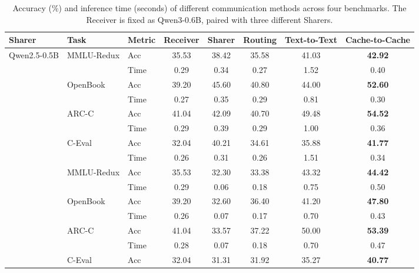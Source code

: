 \begin{table}[t]
\centering
\caption{Accuracy (\%) and inference time (seconds) of different communication methods across four benchmarks. The Receiver is fixed as Qwen3-0.6B, paired with three different Sharers.}
\label{tab:llm_comm}
\footnotesize
\setlength\tabcolsep{4pt}
\begin{tabular}{lll|ccccc}
\toprule
\textbf{Sharer} & \textbf{Task} & \textbf{Metric} & \textbf{Receiver} & \textbf{Sharer} & \textbf{Routing} & \textbf{Text-to-Text} & \textbf{Cache-to-Cache} \\
\midrule
\multirow{9}{*}{Qwen2.5-0.5B} 
 & \multirow{2}{*}{MMLU-Redux}     & Acc  & 35.53 & 38.42 & 35.58 & 41.03 & \textbf{42.92} \\
 &                           & Time & 0.29  & 0.34  & 0.27 & 1.52  & 0.40  \\
\cmidrule(lr){2-8}
 & \multirow{2}{*}{OpenBook} & Acc  & 39.20 & 45.60 & 40.80 & 44.00 & \textbf{52.60} \\
 &                           & Time & 0.27  & 0.35  & 0.29 & 0.81  & 0.30  \\
\cmidrule(lr){2-8}
 & \multirow{2}{*}{ARC-C}    & Acc  & 41.04 & 42.09 & 40.70 & 49.48 & \textbf{54.52} \\
 &                           & Time & 0.29  & 0.39  & 0.29 & 1.00  & 0.36  \\
\cmidrule(lr){2-8}
 & \multirow{2}{*}{C-Eval}   & Acc  & 32.04 & 40.21 & 34.61 & 35.88 & \textbf{41.77} \\
 &                           & Time & 0.26  & 0.31  & 0.26 & 1.51  & 0.34  \\
\midrule
\multirow{9}{*}{Llama3.2-1B} 
 & \multirow{2}{*}{MMLU-Redux}     & Acc  & 35.53 & 32.30 & 33.38 & 43.32 & \textbf{44.42} \\
 &                           & Time & 0.29  & 0.06  & 0.18 & 0.75  & 0.50  \\
\cmidrule(lr){2-8}
 & \multirow{2}{*}{OpenBook} & Acc  & 39.20 & 32.60 & 36.40 & 41.20 & \textbf{47.80} \\
 &                           & Time & 0.26  & 0.07  & 0.17 & 0.70  & 0.43  \\
\cmidrule(lr){2-8}
 & \multirow{2}{*}{ARC-C}    & Acc  & 41.04 & 33.57 & 37.22 & 50.00 & \textbf{53.39} \\
 &                           & Time & 0.28  & 0.07  & 0.18 & 0.70  & 0.47  \\
\cmidrule(lr){2-8}
 & \multirow{2}{*}{C-Eval}   & Acc  & 32.04 & 31.31 & 31.92 & 35.27 & \textbf{40.77} \\

\end{tabular}
\end{table}
